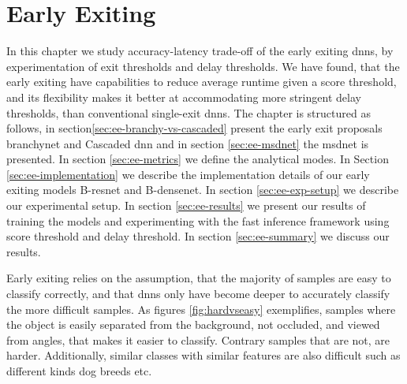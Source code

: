 \hypertarget{earlyexiting}{%
	\chapter{Early Exiting}\label{ch:earlyexit}}

In this chapter we study accuracy-latency trade-off of the early exiting \gls{dnn}s, by experimentation of exit thresholds and delay thresholds. We have found, that the early exiting have capabilities to reduce average runtime given a score threshold, and its flexibility makes it better at accommodating more stringent delay thresholds, than conventional single-exit \gls{dnn}s. The chapter is structured as follows, in section\ref{sec:ee-branchy-vs-cascaded} present the early exit proposals \gls{branchynet} and Cascaded \gls{dnn} and in section \ref{sec:ee-msdnet} the \gls{msdnet} is presented. In section \ref{sec:ee-metrics} we define the analytical modes.  In Section \ref{sec:ee-implementation} we describe the implementation details of our early exiting models B-\gls{resnet} and B-\gls{densenet}. In section \ref{sec:ee-exp-setup} we describe our experimental setup. In section \ref{sec:ee-results} we present our results of training the models and experimenting with the fast inference framework using score threshold and delay threshold. In section \ref{sec:ee-summary} we discuss our results.

Early exiting relies on the assumption, that the majority of samples are easy to classify correctly, and that \gls{dnn}s only have become deeper to accurately classify the more difficult samples. As figures \ref{fig:hardvseasy} exemplifies, samples where the object is easily separated from the background, not occluded, and viewed from angles, that makes it easier to classify. Contrary samples that are not, are harder. Additionally, similar classes with similar features are also difficult such as different kinds dog breeds etc.

